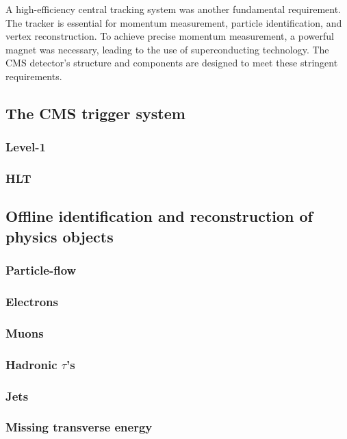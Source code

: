 \documentclass[11pt]{article}
\begin{document}
A high-efficiency central tracking system was another fundamental requirement.
The tracker is essential for momentum measurement, particle identification, and vertex reconstruction.
To achieve precise momentum measurement, a powerful magnet was necessary, leading to the use of superconducting technology.
The CMS detector's structure and components are designed to meet these stringent requirements.
\subsection{The CMS trigger system}
\label{sec:orgbea4ed9}
\subsubsection{Level-1}
\label{sec:org5b1fa84}
\subsubsection{HLT}
\label{sec:orge4dfe76}

\subsection{Offline identification and reconstruction of physics objects}
\label{sec:orgfc20b84}
\subsubsection{Particle-flow}
\label{sec:org265f6ac}
\subsubsection{Electrons}
\label{sec:org43b69c4}
\subsubsection{Muons}
\label{sec:org25d4540}
\subsubsection{Hadronic \(\tau\)'s}
\label{sec:org11f53e6}
\subsubsection{Jets}
\label{sec:orgcea6313}
\subsubsection{Missing transverse energy}
\label{sec:orge0a7158}
\end{document}
